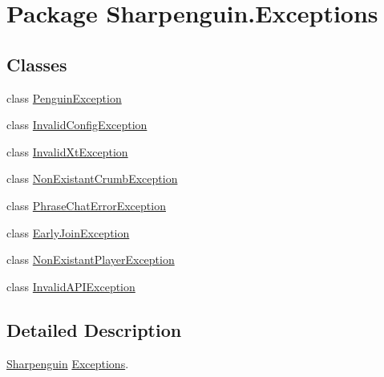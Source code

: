 \hypertarget{namespaceSharpenguin_1_1Exceptions}{\section{Package Sharpenguin.\-Exceptions}
\label{namespaceSharpenguin_1_1Exceptions}
}
\subsection*{Classes}
\begin{DoxyCompactItemize}
\item 
class \hyperlink{classSharpenguin_1_1Exceptions_1_1PenguinException}{Penguin\-Exception}
\item 
class \hyperlink{classSharpenguin_1_1Exceptions_1_1InvalidConfigException}{Invalid\-Config\-Exception}
\item 
class \hyperlink{classSharpenguin_1_1Exceptions_1_1InvalidXtException}{Invalid\-Xt\-Exception}
\item 
class \hyperlink{classSharpenguin_1_1Exceptions_1_1NonExistantCrumbException}{Non\-Existant\-Crumb\-Exception}
\item 
class \hyperlink{classSharpenguin_1_1Exceptions_1_1PhraseChatErrorException}{Phrase\-Chat\-Error\-Exception}
\item 
class \hyperlink{classSharpenguin_1_1Exceptions_1_1EarlyJoinException}{Early\-Join\-Exception}
\item 
class \hyperlink{classSharpenguin_1_1Exceptions_1_1NonExistantPlayerException}{Non\-Existant\-Player\-Exception}
\item 
class \hyperlink{classSharpenguin_1_1Exceptions_1_1InvalidAPIException}{Invalid\-A\-P\-I\-Exception}
\end{DoxyCompactItemize}


\subsection{Detailed Description}
\hyperlink{namespaceSharpenguin}{Sharpenguin} \hyperlink{namespaceSharpenguin_1_1Exceptions}{Exceptions}. 
